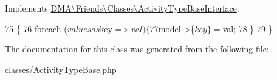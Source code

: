 Implements \hyperlink{interfaceDMA_1_1Friends_1_1Classes_1_1ActivityTypeBaseInterface}{D\+M\+A\textbackslash{}\+Friends\textbackslash{}\+Classes\textbackslash{}\+Activity\+Type\+Base\+Interface}.


\begin{DoxyCode}
75                                               \{
76         \textcolor{keywordflow}{foreach} ($values as $key => $val) \{
77             $model->\{$key\} = $val;
78         \}
79     \}
\end{DoxyCode}


The documentation for this class was generated from the following file\+:\begin{DoxyCompactItemize}
\item 
classes/Activity\+Type\+Base.\+php\end{DoxyCompactItemize}
